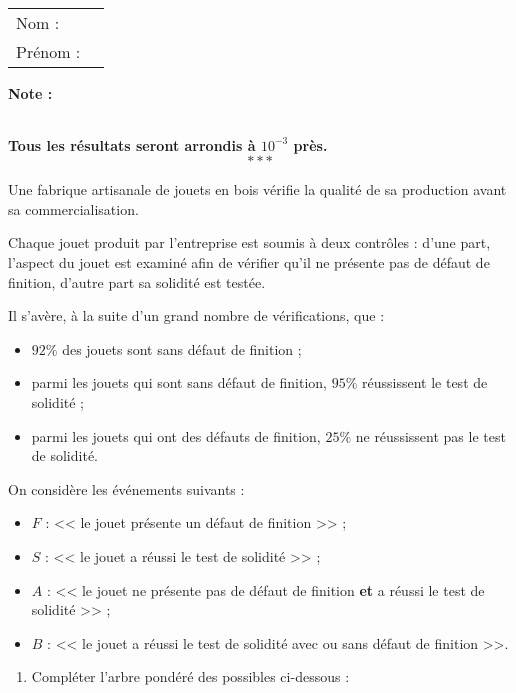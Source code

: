 \documentclass[10pt,french]{book}
\newcommand\competences{
\setcounter{exo}{0}
\begin{tabular}{ll} Nom : \\[5pt] Prénom : \end{tabular}
\hfill
\textbf{Note :}\renewcommand\arraystretch{2.3}
\begin{tabularx}{0.18\linewidth}{|X|}
\hline
\slashbox{\Huge\bfseries\phantom{10}}{\Huge\bfseries 10}\\
\hline
\end{tabularx}\renewcommand\arraystretch{1}\medskip
}
\begin{document}
\clearpage


\competences

\textbf{Tous les résultats seront arrondis à $10^{-3}$ près.}\[***\]

\exo Une fabrique artisanale de jouets en bois vérifie la qualité de sa production avant sa commercialisation.\par
Chaque jouet produit par l'entreprise est soumis à deux contrôles : d'une part, l'aspect du jouet est examiné afin de vérifier qu'il ne présente pas de défaut de finition, d'autre part sa solidité est testée.\par
Il s'avère, à la suite d'un grand nombre de vérifications, que :
\begin{itemize}
    \item $92\%$ des jouets sont sans défaut de finition ;
    \item parmi les jouets qui sont sans défaut de finition, $95\%$ réussissent le test de solidité ;
    \item parmi les jouets qui ont des défauts de finition, $25\%$ ne réussissent pas le test de solidité.
\end{itemize}\medskip

On considère les événements suivants :
\begin{itemize}
    \item $F$ : << le jouet présente un défaut de finition >> ;
    \item $S$ : << le jouet a réussi le test de solidité >> ;
    \item $A$ : << le jouet ne présente pas de défaut de finition \textbf{et} a réussi le test de solidité >> ;
    \item $B$ : << le jouet a réussi le test de solidité avec ou sans défaut de finition >>.
\end{itemize}\medskip

\begin{enumerate}
    \item Compléter l'arbre pondéré des possibles ci-dessous :
\end{enumerate}
\end{document}

